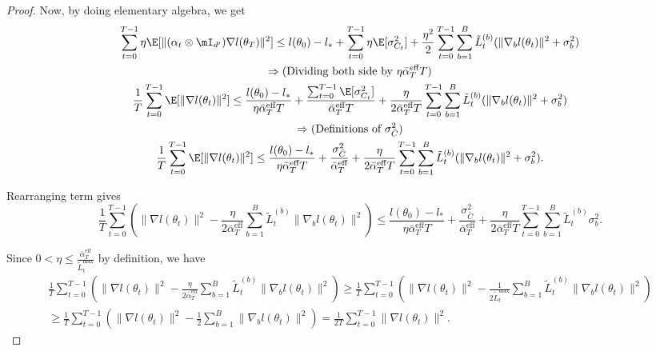 \documentclass[11pt, a4paper, twocolumn, copyright, goog]{google}
\theoremstyle{plain}
\theoremstyle{definition}
\theoremstyle{remark}
\begin{document}
\begin{proof}
    
    Now, by doing elementary algebra, we get
    \begin{multline}
    \sum_{t=0}^{T-1} \eta \E [ \| (\alpha_t \otimes \mI_{d'}) \nabla l (\theta_T) \|^2 ] 
        \le l(\theta_0) - l_* 
            + \sum_{t=0}^{T-1} \eta \E[\sigma^2_{C_t}] 
            + \frac{\eta^2}{2} \sum_{t=0}^{T-1} \sum_{b=1}^{B} \tilde{L}_{t}^{(b)} (\|\nabla_b l(\theta_t) \|^2  + \sigma_b^2) \\
        \Rightarrow (\text{Dividing both side by } \eta     \bar{\alpha}_{T}^{\textrm{eff}} T) \\ 
    \frac{1}{T} \sum_{t=0}^{T-1} \E [ \| \nabla l(\theta_t) \|^2] 
        \le \frac{l(\theta_0) - l_* }{\eta \bar{\alpha}_{T}^{\textrm{eff}} T}
            +  \frac{\sum_{t=0}^{T-1} \E[\sigma^2_{C_t}]}{\bar{\alpha}_{T}^{\textrm{eff}} T}  
            + \frac{\eta}{2 \bar{\alpha}_{T}^{\textrm{eff}} T} \sum_{t=0}^{T-1} \sum_{b=1}^{B} \tilde{L}_{t}^{(b)} (\|\nabla_b l(\theta_t) \|^2  + \sigma_b^2) \\
        \Rightarrow (\text{Definitions of } \sigma^2_{\bar{C}})  \\
    \frac{1}{T} \sum_{t=0}^{T-1} \E [ \| \nabla l(\theta_t) \|^2] 
        \le \frac{l(\theta_0) - l_* }{\eta \bar{\alpha}_{T}^{\textrm{eff}} T}
            +   \frac{\sigma^2_{\bar{C}}}{\bar{\alpha}_{T}^{\textrm{eff}}}  
            + \frac{\eta}{2 \bar{\alpha}_{T}^{\textrm{eff}} T} \sum_{t=0}^{T-1} \sum_{b=1}^{B} \tilde{L}_{t}^{(b)} (\|\nabla_b l(\theta_t) \|^2  + \sigma_b^2).
    \end{multline}
    
    Rearranging term gives
    \begin{equation} \label{intem:rearrange}
        \frac{1}{T} \sum_{t=0}^{T-1} \left( \|\nabla l(\theta_t) \|^2
            - \frac{\eta}{2 \bar{\alpha}_{T}^{\textrm{eff}}} \sum_{b=1}^{B} \tilde{L}_{t}^{(b)}\|\nabla_b l(\theta_t) \|^2 \right) 
        \le \frac{l(\theta_0) - l_* }{\eta \bar{\alpha}_{T}^{\textrm{eff}} T}
            +   \frac{\sigma^2_{\bar{C}}}{\bar{\alpha}_{T}^{\textrm{eff}}}  
            + \frac{\eta}{2 \bar{\alpha}_{T}^{\textrm{eff}} T} \sum_{t=0}^{T-1} \sum_{b=1}^{B} \tilde{L}_{t}^{(b)} \sigma_b^2.
    \end{equation}
    
    Since $0 < \eta \leq \frac{\bar{\alpha}_{T}^{\textrm{eff}}}{ \tilde{L}_t^{\max}} $ by definition, we have
    \begin{multline} \label{intem:lr_apply}
        \frac{1}{T} \sum_{t=0}^{T-1} \left( \|\nabla l(\theta_t) \|^2
            - \frac{\eta}{2 \bar{\alpha}_{T}^{\textrm{eff}}} \sum_{b=1}^{B} \tilde{L}_{t}^{(b)}\|\nabla_b l(\theta_t) \|^2 \right) 
        \ge \frac{1}{T} \sum_{t=0}^{T-1} \left( \|\nabla l(\theta_t) \|^2
            - \frac{1}{2 \tilde{L}_t^{\max}} \sum_{b=1}^{B} \tilde{L}_{t}^{(b)}\|\nabla_b l(\theta_t) \|^2 \right)  \\
        \ge \frac{1}{T} \sum_{t=0}^{T-1} \left( \|\nabla l(\theta_t) \|^2
            - \frac{1}{2} \sum_{b=1}^{B} \|\nabla_b l(\theta_t) \|^2 \right) 
        = \frac{1}{2T} \sum_{t=0}^{T-1}  \|\nabla l(\theta_t) \|^2.
    \end{multline}
    

\end{proof}
\end{document}
